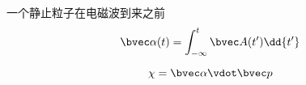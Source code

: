 

一个静止粒子在电磁波到来之前
\begin{equation}
\bvec \alpha(t) = \int_{-\infty}^t \bvec A(t') \dd{t'}
\end{equation}

\begin{equation}
\chi = \bvec \alpha \vdot \bvec p
\end{equation}
